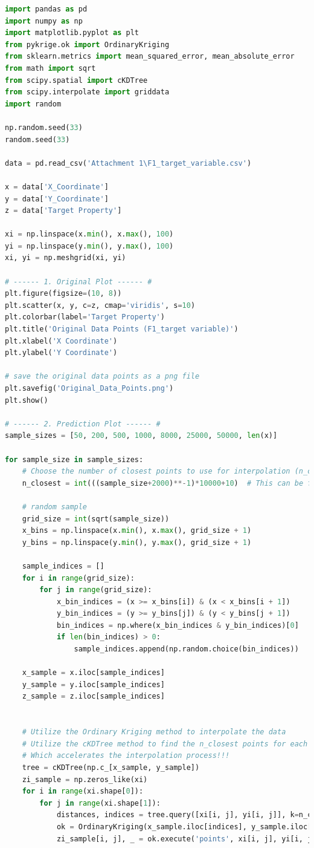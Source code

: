 \documentclass{swmcmthesis}
\begin{document}
\begin{lstlisting}[language=python,caption={The python programme for Problem 1}]
import pandas as pd
import numpy as np
import matplotlib.pyplot as plt
from pykrige.ok import OrdinaryKriging
from sklearn.metrics import mean_squared_error, mean_absolute_error
from math import sqrt
from scipy.spatial import cKDTree
from scipy.interpolate import griddata
import random

np.random.seed(33)
random.seed(33)

data = pd.read_csv('Attachment 1\F1_target_variable.csv')

x = data['X_Coordinate']
y = data['Y_Coordinate']
z = data['Target Property']

xi = np.linspace(x.min(), x.max(), 100)
yi = np.linspace(y.min(), y.max(), 100)
xi, yi = np.meshgrid(xi, yi)

# ------ 1. Original Plot ------ #
plt.figure(figsize=(10, 8))
plt.scatter(x, y, c=z, cmap='viridis', s=10)
plt.colorbar(label='Target Property')  
plt.title('Original Data Points (F1_target variable)')
plt.xlabel('X Coordinate')
plt.ylabel('Y Coordinate')

# save the original data points as a png file
plt.savefig('Original_Data_Points.png')
plt.show()

# ------ 2. Prediction Plot ------ #
sample_sizes = [50, 200, 500, 1000, 8000, 25000, 50000, len(x)] 

for sample_size in sample_sizes:
    # Choose the number of closest points to use for interpolation (n_closest) based on the sample size
    n_closest = int(((sample_size+2000)**-1)*10000+10)  # This can be further examined and optimized based on the data
    
    # random sample
    grid_size = int(sqrt(sample_size))
    x_bins = np.linspace(x.min(), x.max(), grid_size + 1)
    y_bins = np.linspace(y.min(), y.max(), grid_size + 1)

    sample_indices = []
    for i in range(grid_size):
        for j in range(grid_size):
            x_bin_indices = (x >= x_bins[i]) & (x < x_bins[i + 1])
            y_bin_indices = (y >= y_bins[j]) & (y < y_bins[j + 1])
            bin_indices = np.where(x_bin_indices & y_bin_indices)[0]
            if len(bin_indices) > 0:
                sample_indices.append(np.random.choice(bin_indices))

    x_sample = x.iloc[sample_indices]
    y_sample = y.iloc[sample_indices]
    z_sample = z.iloc[sample_indices]


    # Utilize the Ordinary Kriging method to interpolate the data
    # Utilize the cKDTree method to find the n_closest points for each grid point.
    # Which accelerates the interpolation process!!!
    tree = cKDTree(np.c_[x_sample, y_sample])
    zi_sample = np.zeros_like(xi)
    for i in range(xi.shape[0]):
        for j in range(xi.shape[1]):
            distances, indices = tree.query([xi[i, j], yi[i, j]], k=n_closest)
            ok = OrdinaryKriging(x_sample.iloc[indices], y_sample.iloc[indices], z_sample.iloc[indices], variogram_model='linear')
            zi_sample[i, j], _ = ok.execute('points', xi[i, j], yi[i, j])


\end{lstlisting}
\end{document}
